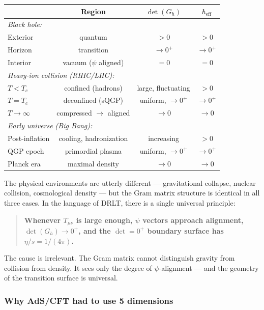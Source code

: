 \begin{center}
\begin{tabular}{lccc}
\hline
& Region & $\det(G_h)$ & $\hbar_\text{eff}$ \\
\hline
\multicolumn{4}{l}{\emph{Black hole:}} \\
\quad Exterior & quantum & $> 0$ & $> 0$ \\
\quad Horizon & transition & $\to 0^+$ & $\to 0^+$ \\
\quad Interior & vacuum ($\psi$ aligned) & $= 0$ & $= 0$ \\
\hline
\multicolumn{4}{l}{\emph{Heavy-ion collision (RHIC/LHC):}} \\
\quad $T < T_c$ & confined (hadrons) & large, fluctuating & $> 0$ \\
\quad $T = T_c$ & deconfined (sQGP) & uniform, $\to 0^+$ & $\to 0^+$ \\
\quad $T \to \infty$ & compressed $\to$ aligned & $\to 0$ & $\to 0$ \\
\hline
\multicolumn{4}{l}{\emph{Early universe (Big Bang):}} \\
\quad Post-inflation & cooling, hadronization & increasing & $> 0$ \\
\quad QGP epoch & primordial plasma & uniform, $\to 0^+$ & $\to 0^+$ \\
\quad Planck era & maximal density & $\to 0$ & $\to 0$ \\
\hline
\end{tabular}
\end{center}

The physical environments are utterly different --- gravitational collapse, nuclear collision, cosmological density --- but the Gram matrix structure is identical in all three cases. In the language of DRLT, there is a single universal principle:

\begin{quote}
\textbf{Whenever $T_{\mu\nu}$ is large enough, $\psi$ vectors approach alignment, $\det(G_h) \to 0^+$, and the $\det = 0^+$ boundary surface has $\eta/s = 1/(4\pi)$.}
\end{quote}

The cause is irrelevant. The Gram matrix cannot distinguish gravity from collision from density. It sees only the degree of $\psi$-alignment --- and the geometry of the transition surface is universal.

\subsubsection{Why AdS/CFT had to use 5 dimensions}

